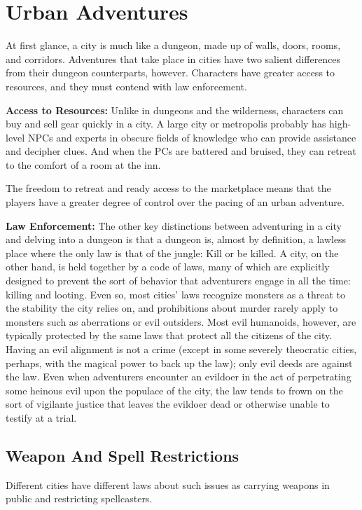 \section{Urban Adventures}
At first glance, a city is much like a dungeon, made up of walls, doors, rooms, and corridors. Adventures that take place in cities have two salient differences from their dungeon counterparts, however. Characters have greater access to resources, and they must contend with law enforcement.

\textbf{Access to Resources:} Unlike in dungeons and the wilderness, characters can buy and sell gear quickly in a city. A large city or metropolis probably has high-level NPCs and experts in obscure fields of knowledge who can provide assistance and decipher clues. And when the PCs are battered and bruised, they can retreat to the comfort of a room at the inn.

The freedom to retreat and ready access to the marketplace means that the players have a greater degree of control over the pacing of an urban adventure.

\textbf{Law Enforcement:} The other key distinctions between adventuring in a city and delving into a dungeon is that a dungeon is, almost by definition, a lawless place where the only law is that of the jungle: Kill or be killed. A city, on the other hand, is held together by a code of laws, many of which are explicitly designed to prevent the sort of behavior that adventurers engage in all the time: killing and looting. Even so, most cities' laws recognize monsters as a threat to the stability the city relies on, and prohibitions about murder rarely apply to monsters such as aberrations or evil outsiders. Most evil humanoids, however, are typically protected by the same laws that protect all the citizens of the city. Having an evil alignment is not a crime (except in some severely theocratic cities, perhaps, with the magical power to back up the law); only evil deeds are against the law. Even when adventurers encounter an evildoer in the act of perpetrating some heinous evil upon the populace of the city, the law tends to frown on the sort of vigilante justice that leaves the evildoer dead or otherwise unable to testify at a trial.

\subsection{Weapon And Spell Restrictions}
Different cities have different laws about such issues as carrying weapons in public and restricting spellcasters.

